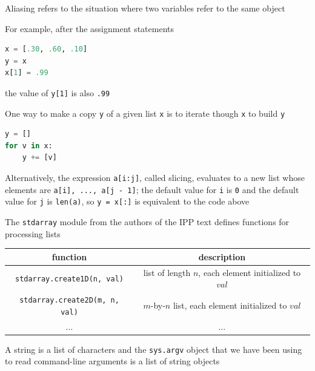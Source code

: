 \documentclass[8pt,a4paper,compress]{beamer}
\begin{document}
\begin{frame}[fragile]
\pause

Aliasing refers to the situation where two variables refer to the same object

\pause
\bigskip

For example, after the assignment statements
\begin{lstlisting}[language=Python]
x = [.30, .60, .10]
y = x
x[1] = .99
\end{lstlisting}
the value of \lstinline{y[1]} is also \lstinline{.99}

\pause
\bigskip

One way to make a copy \lstinline{y} of a given list \lstinline{x} is to iterate though \lstinline{x} to build \lstinline{y}
\begin{lstlisting}[language=Python]
y = []
for v in x:
    y += [v]
\end{lstlisting}

\pause
\bigskip

Alternatively, the expression \lstinline{a[i:j]}, called slicing,  evaluates to a new list whose elements are \lstinline{a[i], ..., a[j - 1]}; the default value for \lstinline{i} is \lstinline{0} and the default value for \lstinline{j} is \lstinline{len(a)}, so \lstinline{y = x[:]} is equivalent to the code above

\pause
\bigskip

The \lstinline{stdarray} module from the authors of the IPP text defines functions for processing lists

\begin{center}
\begin{tabular}{cc}
function & description \\ \hline
\lstinline$stdarray.create1D(n, val)$ & list of length $n$, each element initialized to $val$ \\
\lstinline$stdarray.create2D(m, n, val)$ & $m$-by-$n$ list, each element initialized to $val$ \\
$\dots$ & $\dots$
\end{tabular} 
\end{center}

\pause
\bigskip

A string is a list of characters and the \lstinline{sys.argv} object that we have been using to read command-line arguments is a list of string objects
\end{frame}
\end{document}

